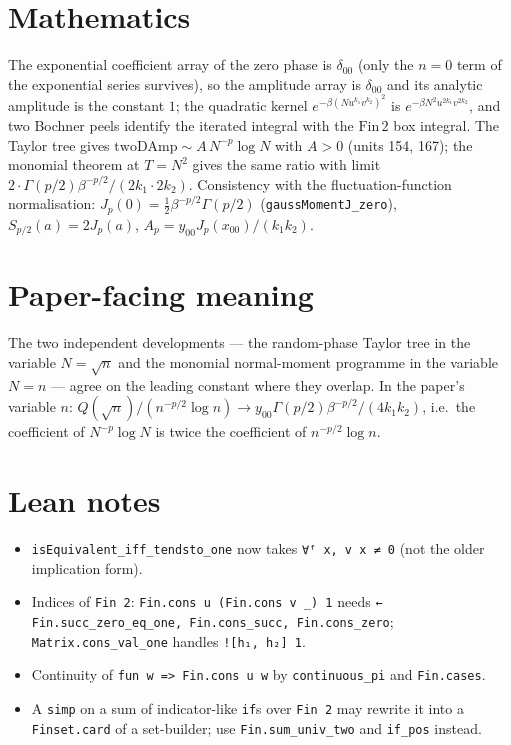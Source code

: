 \documentclass[11pt]{article}
\begin{document}
\section{Mathematics}
The exponential coefficient array of the zero phase is $\delta_{00}$ (only the $n=0$ term of the
exponential series survives), so the amplitude array is $\delta_{00}$ and its analytic amplitude is
the constant $1$; the quadratic kernel $e^{-\beta(Nu^{k_1}v^{k_2})^2}$ is $e^{-\beta N^2u^{2k_1}v^{2k_2}}$,
and two Bochner peels identify the iterated integral with the $\mathrm{Fin}\,2$ box integral. The
Taylor tree gives $\mathrm{twoDAmp}\sim A\,N^{-p}\log N$ with $A>0$ (units 154, 167); the monomial
theorem at $T=N^2$ gives the same ratio with limit $2\cdot\Gamma(p/2)\beta^{-p/2}/(2k_1\cdot2k_2)$.
Consistency with the fluctuation-function normalisation: $J_p(0)=\tfrac12\beta^{-p/2}\Gamma(p/2)$
(\texttt{gaussMomentJ\_zero}), $S_{p/2}(a)=2J_p(a)$, $A_p=y_{00}J_p(x_{00})/(k_1k_2)$.

\section{Paper-facing meaning}
The two independent developments --- the random-phase Taylor tree in the variable $N=\sqrt n$ and
the monomial normal-moment programme in the variable $N=n$ --- agree on the leading constant where
they overlap. In the paper's variable $n$: $Q(\sqrt n)/(n^{-p/2}\log n)\to y_{00}\Gamma(p/2)\beta^{-p/2}/(4k_1k_2)$,
i.e.\ the coefficient of $N^{-p}\log N$ is twice the coefficient of $n^{-p/2}\log n$.

\section{Lean notes}
\begin{itemize}
\item \texttt{isEquivalent\_iff\_tendsto\_one} now takes \texttt{∀ᶠ x, v x ≠ 0} (not the older
implication form).
\item Indices of \texttt{Fin 2}: \texttt{Fin.cons u (Fin.cons v \_) 1} needs
\texttt{← Fin.succ\_zero\_eq\_one, Fin.cons\_succ, Fin.cons\_zero}; \texttt{Matrix.cons\_val\_one}
handles \texttt{![h₁, h₂] 1}.
\item Continuity of \texttt{fun w => Fin.cons u w} by \texttt{continuous\_pi} and \texttt{Fin.cases}.
\item A \texttt{simp} on a sum of indicator-like \texttt{if}s over \texttt{Fin 2} may rewrite it into
a \texttt{Finset.card} of a set-builder; use \texttt{Fin.sum\_univ\_two} and \texttt{if\_pos} instead.
\end{itemize}
\end{document}
